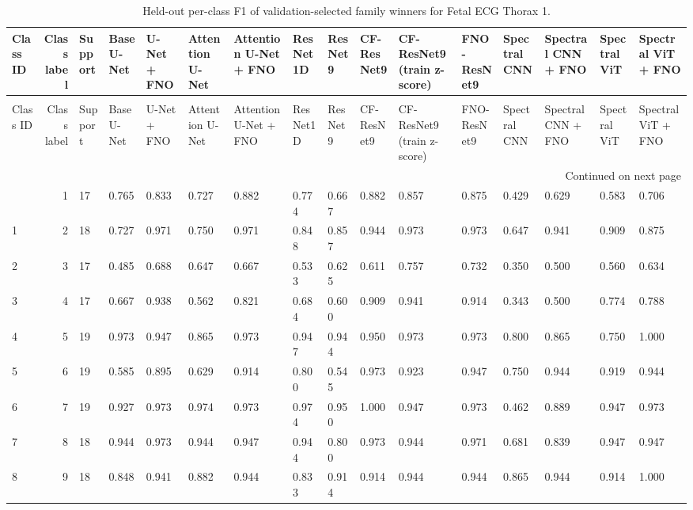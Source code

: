 \begin{longtable}{lrllllllllllllll}
\caption{Held-out per-class F1 of validation-selected family winners for Fetal ECG Thorax 1.} \label{tab:noninvasivefetalecgthorax1_per_class_f1} \\
\toprule
Class ID & Class label & Support & Base U-Net & U-Net + FNO & Attention U-Net & Attention U-Net + FNO & ResNet1D & ResNet9 & CF-ResNet9 & CF-ResNet9 (train z-score) & FNO-ResNet9 & Spectral CNN & Spectral CNN + FNO & Spectral ViT & Spectral ViT + FNO \\
\midrule
\endfirsthead
\caption[]{Held-out per-class F1 of validation-selected family winners for Fetal ECG Thorax 1.} \\
\toprule
Class ID & Class label & Support & Base U-Net & U-Net + FNO & Attention U-Net & Attention U-Net + FNO & ResNet1D & ResNet9 & CF-ResNet9 & CF-ResNet9 (train z-score) & FNO-ResNet9 & Spectral CNN & Spectral CNN + FNO & Spectral ViT & Spectral ViT + FNO \\
\midrule
\endhead
\midrule
\multicolumn{16}{r}{Continued on next page} \\
\midrule
\endfoot
\bottomrule
\endlastfoot
0 & 1 & 17 & 0.765 & 0.833 & 0.727 & 0.882 & 0.774 & 0.667 & 0.882 & 0.857 & 0.875 & 0.429 & 0.629 & 0.583 & 0.706 \\
1 & 2 & 18 & 0.727 & 0.971 & 0.750 & 0.971 & 0.848 & 0.857 & 0.944 & 0.973 & 0.973 & 0.647 & 0.941 & 0.909 & 0.875 \\
2 & 3 & 17 & 0.485 & 0.688 & 0.647 & 0.667 & 0.533 & 0.625 & 0.611 & 0.757 & 0.732 & 0.350 & 0.500 & 0.560 & 0.634 \\
3 & 4 & 17 & 0.667 & 0.938 & 0.562 & 0.821 & 0.684 & 0.600 & 0.909 & 0.941 & 0.914 & 0.343 & 0.500 & 0.774 & 0.788 \\
4 & 5 & 19 & 0.973 & 0.947 & 0.865 & 0.973 & 0.947 & 0.944 & 0.950 & 0.973 & 0.973 & 0.800 & 0.865 & 0.750 & 1.000 \\
5 & 6 & 19 & 0.585 & 0.895 & 0.629 & 0.914 & 0.800 & 0.545 & 0.973 & 0.923 & 0.947 & 0.750 & 0.944 & 0.919 & 0.944 \\
6 & 7 & 19 & 0.927 & 0.973 & 0.974 & 0.973 & 0.974 & 0.950 & 1.000 & 0.947 & 0.973 & 0.462 & 0.889 & 0.947 & 0.973 \\
7 & 8 & 18 & 0.944 & 0.973 & 0.944 & 0.947 & 0.944 & 0.800 & 0.973 & 0.944 & 0.971 & 0.681 & 0.839 & 0.947 & 0.947 \\
8 & 9 & 18 & 0.848 & 0.941 & 0.882 & 0.944 & 0.833 & 0.914 & 0.914 & 0.944 & 0.944 & 0.865 & 0.944 & 0.914 & 1.000 \\

\end{longtable}
